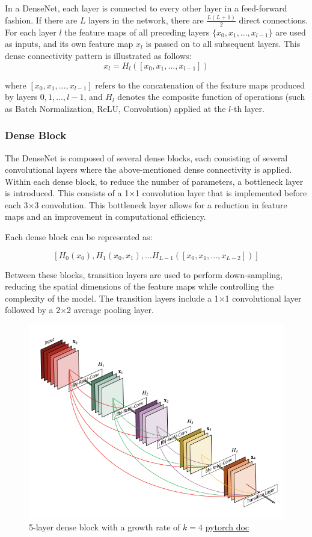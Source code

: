 \documentclass[twocolumn,superscriptaddress,aps]{revtex4-1}
\begin{document}
In a DenseNet, each layer is connected to every other layer in a feed-forward fashion. If there are $L$ layers in the network, there are $\frac{L(L+1)}{2}$ direct connections. For each layer $l$ the feature maps of all preceding layers $\{x_0, x_1, ..., x_{l-1}\}$ are used as inputs, and its own feature map $x_l$ is passed on to all subsequent layers. This dense connectivity pattern is illustrated as follows:
$$x_l = H_l([x_0, x_1, ..., x_{l-1}])$$

where $[x_0, x_1, ..., x_{l-1}]$  refers to the concatenation of the feature maps produced by layers $0, 1, ..., l-1$, and $H_l$ denotes the composite function of operations (such as Batch Normalization, ReLU, Convolution) applied at the $l$-th layer.

\subsubsection{Dense Block}

The DenseNet is composed of several dense blocks, each consisting of several convolutional layers where the above-mentioned dense connectivity is applied. Within each dense block, to reduce the number of parameters, a bottleneck layer is introduced. This consists of a 1×1 convolution layer that is implemented before each 3×3 convolution. This bottleneck layer allows for a reduction in feature maps and an improvement in computational efficiency.

Each dense block can be represented as:

$$[H_0(x_0), H_1(x_0, x_1), ... H_{L-1}([x_0, x_1, ..., x_{L-2}])]$$

Between these blocks, transition layers are used to perform down-sampling, reducing the spatial dimensions of the feature maps while controlling the complexity of the model. The transition layers include a 1×1 convolutional layer followed by a 2×2 average pooling layer.

\begin{figure}[hbtp]
    \centering
    \includegraphics[width = 0.3 \textwidth]{images/dense_block.png}
    \caption{5-layer dense block with a growth rate of $k=4$ \href{https://pytorch.org/hub/pytorch_vision_densenet/?fbclid=IwZXh0bgNhZW0CMTAAAR2QMv_xnytuuHmi7n34mhoB6XCRXNTiO3u_fmpqeSZaPDUBdR6R2FNBUYs_aem_AbJUZaQWuj1e5Ljq4fDnHdOomyKn37ecNYOHxxY7p05yRNH6rG_MAFDLYep3f6NVew4tn8zNwhHHC5uCMY9ibzLE}{pytorch doc}}
    \label{fig:dense_block}
\end{figure}
\end{document}
